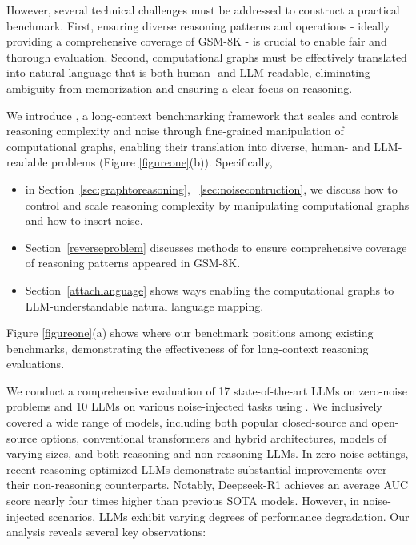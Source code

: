However, several technical challenges must be addressed to construct a practical benchmark. First, ensuring diverse reasoning patterns and operations - ideally providing a comprehensive coverage of GSM-8K - is crucial to enable fair and thorough evaluation. Second, computational graphs must be effectively translated into natural language that is both human- and LLM-readable, eliminating ambiguity from memorization and ensuring a clear focus on reasoning. 

We introduce \sysb, a long-context benchmarking framework that scales and controls reasoning complexity and noise through fine-grained manipulation of computational graphs, enabling their translation into diverse, human- and LLM-readable problems (Figure \ref{figureone}(b)). Specifically, 
\begin{itemize}[itemsep=0.0pt, topsep=0pt, leftmargin=*]
    \item in Section~\ref{sec:graphtoreasoning}, ~\ref{sec:noisecontruction}, we discuss how to control and scale reasoning complexity by manipulating computational graphs and how to insert noise. 
    \item Section~\ref{reverseproblem} discusses methods to ensure comprehensive coverage of reasoning patterns appeared in GSM-8K. 
    \item Section~\ref{attachlanguage} shows ways enabling the computational graphs to LLM-understandable natural language mapping. 
\end{itemize}

Figure \ref{figureone}(a) shows where our benchmark positions among existing benchmarks, demonstrating the effectiveness of \sysb for long-context reasoning evaluations.

We conduct a comprehensive evaluation of 17 state-of-the-art LLMs on zero-noise problems and 10 LLMs on various noise-injected tasks using \sysb. 
We inclusively covered a wide range of models, including both popular closed-source and open-source options, conventional transformers and hybrid architectures, models of varying sizes, and both reasoning and non-reasoning LLMs. 
In zero-noise settings, recent reasoning-optimized LLMs demonstrate substantial improvements over their non-reasoning counterparts. Notably, Deepseek-R1 \citep{deepseekai2025deepseekr1incentivizingreasoningcapability} achieves an average AUC score nearly four times higher than previous SOTA models. However, in noise-injected scenarios, LLMs exhibit varying degrees of performance degradation. Our analysis reveals several key observations:
  

